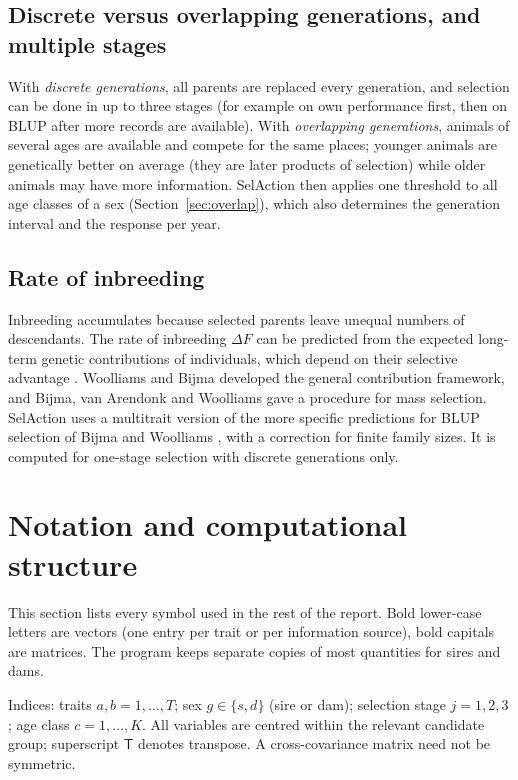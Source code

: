 \documentclass[11pt]{article}
\begin{document}
\subsection{Discrete versus overlapping generations, and multiple stages}
With \emph{discrete generations}, all parents are replaced every generation, and selection can be done in up to three stages (for example on own performance first, then on BLUP after more records are available). With \emph{overlapping generations}, animals of several ages are available and compete for the same places; younger animals are genetically better on average (they are later products of selection) while older animals may have more information. SelAction then applies one threshold to all age classes of a sex (Section~\ref{sec:overlap}), which also determines the generation interval and the response per year.

\subsection{Rate of inbreeding}
Inbreeding accumulates because selected parents leave unequal numbers of descendants. The rate of inbreeding $\Delta F$ can be predicted from the expected long-term genetic contributions of individuals, which depend on their selective advantage \cite{wraythompson1990}. Woolliams and Bijma \cite{woolliamsbijma2000} developed the general contribution framework, and Bijma, van Arendonk and Woolliams \cite{bijmavanarendonkwoolliams2000} gave a procedure for mass selection. SelAction uses a multitrait version of the more specific predictions for BLUP selection of Bijma and Woolliams \cite{bijmawoolliams2000}, with a correction for finite family sizes. It is computed for one-stage selection with discrete generations only.

\section{Notation and computational structure}\label{sec:notation}
\begin{inwords}
This section lists every symbol used in the rest of the report. Bold lower-case letters are vectors (one entry per trait or per information source), bold capitals are matrices. The program keeps separate copies of most quantities for sires and dams.
\end{inwords}

Indices: traits $a,b=1,\dots,T$; sex $g\in\{s,d\}$ (sire or dam); selection stage $j=1,2,3$; age class $c=1,\dots,K$. All variables are centred within the relevant candidate group; superscript $\mathsf T$ denotes transpose. A cross-covariance matrix need not be symmetric.
\end{document}
